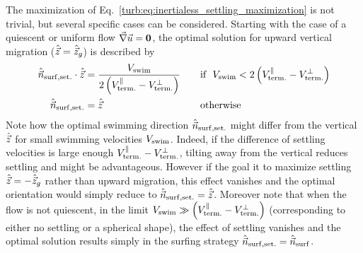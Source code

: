 The maximization of Eq.~\eqref{turb:eq:inertialess_settling_maximization} is not trivial, but several specific cases can be considered.
Starting with the case of a quiescent or uniform flow $\vec{\nabla} \vec{u} = \boldsymbol{0}$, the optimal solution for upward vertical migration ($\hat{\vec{z}} = \hat{\vec{z}}_g$) is described by
\begin{subequations}
	\begin{align}
		\hat{\vec{n}}_{\mathrm{surf, set.}} \cdot \hat{\vec{z}} &= \frac{V_{\mathrm{swim}}}{2 \left( V_{\mathrm{term.}}^\parallel - V_{\mathrm{term.}}^\perp \right)} \quad &&\text{if} ~~ V_{\mathrm{swim}} < 2 \left( V_{\mathrm{term.}}^\parallel - V_{\mathrm{term.}}^\perp \right) \\
		\hat{\vec{n}}_{\mathrm{surf, set.}} &= \hat{\vec{z}} &&\text{otherwise}
	\end{align}
\end{subequations}
Note how the optimal swimming direction $\hat{\vec{n}}_{\mathrm{surf, set.}}$ might differ from the vertical $\hat{\vec{z}}$ for small swimming velocities $V_{\mathrm{swim}}$.
Indeed, if the difference of settling velocities is large enough $V_{\mathrm{term.}}^\parallel - V_{\mathrm{term.}}^\perp$, tilting away from the vertical reduces settling and might be advantageous.
However if the goal it to maximize settling $\hat{\vec{z}} = -\hat{\vec{z}}_g$ rather than upward migration, this effect vanishes and the optimal orientation would simply reduce to $\hat{\vec{n}}_{\mathrm{surf, set.}} = \hat{\vec{z}}$.
Moreover note that when the flow is not quiescent, in the limit $V_{\mathrm{swim}} \gg \left( V_{\mathrm{term.}}^\parallel - V_{\mathrm{term.}}^\perp \right)$ (corresponding to either no settling or a spherical shape), the effect of settling vanishes and the optimal solution results simply in the surfing strategy $\hat{\vec{n}}_{\mathrm{surf, set.}} = \hat{\vec{n}}_{\mathrm{surf}}$.

